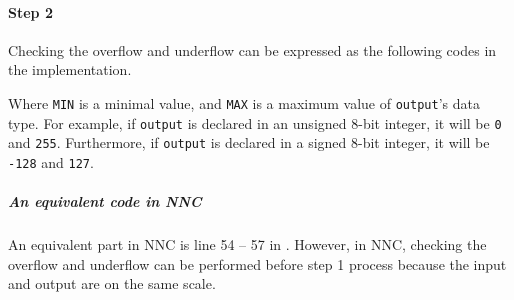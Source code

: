\paragraph{Step 2} Checking the overflow and underflow can be expressed as the following codes in the implementation.

\begin{quote}
  
\end{quote}

Where \texttt{MIN} is a minimal value, and \texttt{MAX} is a maximum value of \texttt{output}'s data type. For example, if \texttt{output} is declared in an unsigned 8-bit integer, it will be \texttt{0} and \texttt{255}. Furthermore, if \texttt{output} is declared in a signed 8-bit integer, it will be \texttt{-128} and \texttt{127}.

\subparagraph{An equivalent code in NNC}
An equivalent part in NNC is line 54 -- 57 in . However, in NNC, checking the overflow and underflow can be performed before step 1 process because the input and output are on the same scale.

